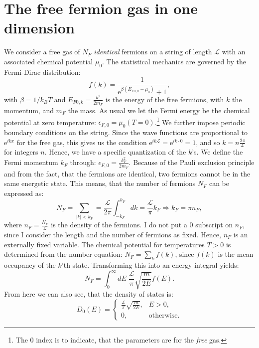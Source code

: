 \section{The free fermion gas in one dimension} \label{sec.chemicalpotential.freegas}
We consider a free gas of $N_F$ \textit{identical} fermions on a string of length $\mathcal{L}$ with an associated chemical potential $\mu_0$. The statistical mechanics are governed by the Fermi-Dirac distribution:
\begin{equation}
f(k) = \frac{1}{\text{e}^{\beta(E_{F0,k}-\mu_0)} + 1},
\end{equation}
with $\beta = 1/k_BT$ and $E_{F0,k} = \frac{k^2}{2m_F}$ is the energy of the free fermions, with $k$ the momentum, and $m_F$ the mass. As usual we let the Fermi energy be the chemical potential at zero temperature: $\epsilon_{F,0} = \mu_0(T=0)$.\footnote{The 0 index is to indicate, that the parameters are for the \textit{free} gas.} We further impose periodic boundary conditions on the string. Since the wave functions are proportional to $\text{e}^{ikx}$ for the free gas, this gives us the condition $\text{e}^{ik\mathcal{L}} = \text{e}^{ik\cdot 0} = 1$, and so $k = n\frac{2\pi}{\mathcal{L}}$ for integers $n$. Hence, we have a specific quantization of the $k$'s. We define the Fermi momentum $k_F$ through: $\epsilon_{F,0} = \frac{k_F^2}{2m_F}$. Because of the Pauli exclusion principle and from the fact, that the fermions are identical, two fermions cannot be in the same energetic state. This means, that the number of fermions $N_F$ can be expressed as:
\begin{equation}
N_F = \sum_{|k|< k_F} = \frac{\mathcal{L}}{2\pi} \int_{-k_F}^{k_F} dk = \frac{\mathcal{L}}{\pi} k_F \Rightarrow k_F = \pi n_F, 
\label{eq.relationkfnf}
\end{equation}
where $n_F = \frac{N_F}{\mathcal{L}}$ is the density of the fermions. I do not put a 0 subscript on $n_F$, since I consider the length and the number of fermions as fixed. Hence, $n_F$ is an externally fixed variable. The chemical potential for temperatures $T>0$ is determined from the number equation: $N_F = \sum_k f(k)$, since $f(k)$ is the mean occupancy of the $k$'th state. Transforming this into an energy integral yields:
\begin{equation}
N_F = \int_0^\infty dE \; \frac{\mathcal{L}}{\pi}\sqrt{\frac{m}{2E}} f(E). 
\label{eq.numberequationfreegas}
\end{equation}
From here we can also see, that the density of states is:
\begin{equation}
D_0(E) = \left\{\begin{matrix}
 \frac{\mathcal{L}}{\pi}\sqrt{\frac{m}{2E}}, & E > 0,  \\ 
 0, & \text{otherwise}. 
\end{matrix}\right. 
\label{eq.densityofstatesfreegas}
\end{equation}
